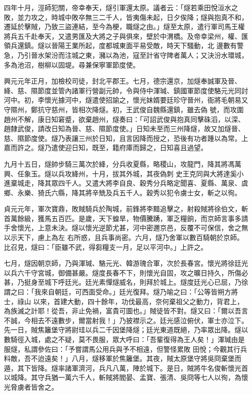\begin{pinyinscope}
 四年十月，涇師犯關，帝幸奉天，燧引軍還太原。議者云：「燧若乘田悅洹水之敗，並力攻之，時城中敗卒無三二千人，皆夷傷未起，日夕俟降；燧與抱真不和，遷延於擊賊，乃致三盜連結，至今為梗，職燧之由。」燧至太原，遣行軍司馬王權將兵五千赴奉天，又遣男匯及大將之子與俱來，壁於中渭橋。及帝幸梁州，權、匯領兵還鎮。燧以晉陽王業所起，度都城東面平易受敵，時天下騷動，北
 邊數有警急，乃引晉水架汾而注城之東，瀦以為池，寇至計省守陴者萬人；又決汾水環城，多為池沼，樹柳以固堤。尋兼保寧軍節度使。



 興元元年正月，加檢校司徒，封北平郡王。七月，德宗還京，加燧奉誠軍及晉、絳、慈、隰節度並管內諸軍行營副元帥，令與侍中渾瑊、鎮國軍節度使駱元光同討河中。初，李懷光據河中，燧遣使招諭之，懷光妹婿要廷珍守晉州，衙將毛朝易又守隰州，鄭抗守慈州，皆相次降燧。初，王武俊自魏縣還鎮，雖去偽
 號，而攻圍趙州不解，康日知窘蹙，欲棄趙州，燧奏曰：「可詔武俊與抱真同擊硃滔，以深、趙隸武俊，請改日知為晉、慈、隰節度使。」日知未至而三州降燧，故又加燧晉、慈、隰節度使。燧乃表讓三州於日知，且言因降而授之，恐後有功者踵以為常。上嘉而許之。燧乃遣使迎日知，既至，籍府庫而歸之，日知喜且過望。



 九月十五日，燧帥步騎三萬次於絳，分兵收夏縣，略稷山，攻龍門，降其將馮萬興、任象玉。燧以兵攻絳州，十月，拔其外城，其夜偽刺
 史王克同與大將達奚小進棄城走，降其眾四千人。又遣大將李自良、穀秀分兵略定聞喜、夏縣、萬泉、虞鄉、永樂、猗氏六縣，降其將辛兟及兵五千人。穀秀以犯令虜士女，斬之以徇。



 貞元元年，軍次寶鼎，敗賊騎兵於陶城，前鋒將李黯追擊之，射殺賊將徐伯文，斬首萬餘級，獲馬五百匹。是歲，天下蝗旱，物價騰踴，軍乏糧餉，而京師言事多請手舍懷光，上意未決。燧以懷光逆節尤甚，河中密邇京邑，反覆不可保信，舍之無以示天下，慮上為左
 右所惑，且兵事尚密。六月，燧乃舍軍以數百騎朝於京師。比召見，燧曰：「臣雖不武，得芻糧支一月，足以平河中。」上許之。



 七月，燧因朝京師，乃與渾瑊、駱元光、韓游瑰合軍，次於長春宮。懷光將徐廷光以兵六千守宮城，御備甚嚴。燧度長春不下，則懷光自固，攻之曠日持久，所傷必甚，乃挺身至城下呼廷光。廷光素憚燧威名，則拜於城上。燧度廷光心已屈，乃徐謂之曰：「我來自朝廷，可西面受命。」廷光復拜。燧乃喻之曰：「公等皆朔方將士，祿山
 以來，首建大動，四十餘年，功伐最高，奈何棄祖父之動力，背君上，為族滅之計耶！從吾，非止免禍，富貴可圖也。」賊徒皆不對。燧又曰：「爾以吾言不誠，今相去不遠數步，爾當射我！」乃披襟示之。廷光感泣俯伏，軍士亦泣下。先一日，賊焦籬堡守將尉珪以兵二千因堡降燧；廷光東道既絕，乃率眾出降。燧以數騎徑入城，處之不疑，莫不畏服，眾大呼曰：「吾輩復得為王人矣！」渾瑊由是服燧，私謂參佐曰：「予嘗謂馬公用兵與予不相遠，但警怪累敗
 田悅；今觀其行兵料敵，吾不迨遠矣！」八月，燧移軍於焦籬堡。其夜，賊太原堡守將吳冏棄堡而遁，其下皆降。燧率諸軍濟河，兵凡八萬，陣於城下。是日，賊將牛名俊斬懷光首以城降。其守兵猶一萬六千人，斬賊將閻晏、孟寶、張清、吳冏等七人以徇，為懷光脅虜者皆舍之。




\end{pinyinscope}
